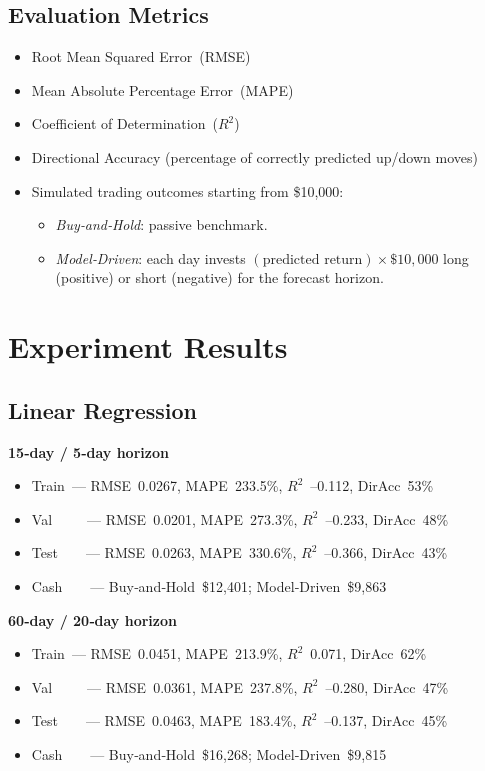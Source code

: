 \documentclass[sigconf]{acmart}
\begin{document}
\subsection{Evaluation Metrics}
\begin{itemize}
  \item Root Mean Squared Error (RMSE)
  \item Mean Absolute Percentage Error (MAPE)
  \item Coefficient of Determination ($R^2$)
  \item Directional Accuracy (percentage of correctly predicted up/down moves)
  \item Simulated trading outcomes starting from \$10{,}000:
        \begin{itemize}
          \item \textit{Buy‑and‑Hold}: passive benchmark.
          \item \textit{Model‑Driven}: each day invests $(\text{predicted return})\times\$10{,}000$ long (positive) or short (negative) for the forecast horizon.
        \end{itemize}
\end{itemize}

\section{Experiment Results}
\subsection{Linear Regression}
\textbf{15‑day / 5‑day horizon}
\begin{itemize}
  \item Train — RMSE 0.0267, MAPE 233.5\%, $R^2$ –0.112, DirAcc 53\%
  \item Val     — RMSE 0.0201, MAPE 273.3\%, $R^2$ –0.233, DirAcc 48\%
  \item Test    — RMSE 0.0263, MAPE 330.6\%, $R^2$ –0.366, DirAcc 43\%
  \item Cash    — Buy‑and‑Hold \$12,401; Model‑Driven \$9,863
\end{itemize}

\textbf{60‑day / 20‑day horizon}
\begin{itemize}
  \item Train — RMSE 0.0451, MAPE 213.9\%, $R^2$ 0.071, DirAcc 62\%
  \item Val     — RMSE 0.0361, MAPE 237.8\%, $R^2$ –0.280, DirAcc 47\%
  \item Test    — RMSE 0.0463, MAPE 183.4\%, $R^2$ –0.137, DirAcc 45\%
  \item Cash    — Buy‑and‑Hold \$16,268; Model‑Driven \$9,815
\end{itemize}
\end{document}
